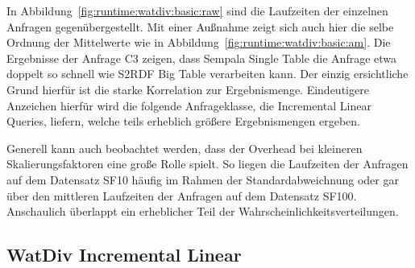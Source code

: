 \documentclass[
  a4paper,
  12pt,
  oneside,
  parskip=half,
  headsepline,
]{scrartcl}
\begin{document}
\begin{figure*}[tb]
	\centering
	\caption{Laufzeiten der WatDiv Basic Anfragen.}
	\label{fig:runtime:watdiv:basic:raw}
\end{figure*}

In Abbildung~\ref{fig:runtime:watdiv:basic:raw} sind die Laufzeiten der
einzelnen Anfragen gegenübergestellt. Mit einer Außnahme zeigt sich auch hier
die selbe Ordnung der Mittelwerte wie in
Abbildung~\ref{fig:runtime:watdiv:basic:am}. Die Ergebnisse der Anfrage C3
zeigen, dass Sempala Single Table die Anfrage etwa doppelt so schnell wie S2RDF
Big Table verarbeiten kann. Der einzig ersichtliche Grund hierfür ist die starke
Korrelation zur Ergebnismenge. Eindeutigere Anzeichen hierfür wird die folgende
Anfrageklasse, die Incremental Linear Queries, liefern, welche teils erheblich
größere Ergebnismengen ergeben.

Generell kann auch beobachtet werden, dass der Overhead bei kleineren
Skalierungsfaktoren eine große Rolle spielt. So liegen die Laufzeiten der
Anfragen auf dem Datensatz SF10 häufig im Rahmen der Standardabweichnung oder
gar über den mittleren Laufzeiten der Anfragen auf dem Datensatz SF100.
Anschaulich überlappt ein erheblicher Teil der Wahrscheinlichkeitsverteilungen.

\subsection{WatDiv Incremental Linear}
\label{sec:eval:il}
\end{document}
